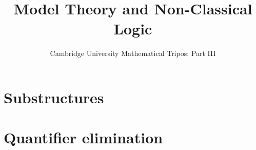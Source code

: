 \documentclass{article}
\title{Model Theory and Non-Classical Logic}
\author{Cambridge University Mathematical Tripos: Part III}
\begin{document}
\maketitle

\tableofcontentsnewpage{}

\section{Substructures}

\section{Quantifier elimination}

\end{document}
